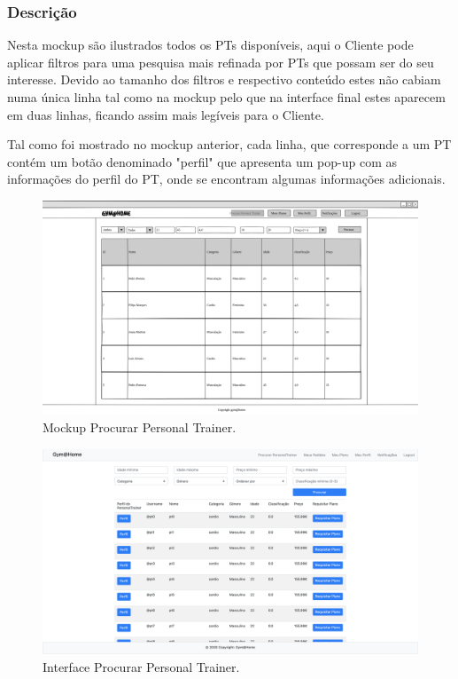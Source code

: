 \subsubsection{Descrição}
\hspace{5mm} Nesta mockup são ilustrados todos os PTs disponíveis, aqui o Cliente pode aplicar filtros para uma pesquisa mais refinada por PTs que possam ser do seu interesse. Devido ao tamanho dos filtros e respectivo conteúdo estes não cabiam numa única linha tal como na mockup pelo que na interface final estes aparecem em duas linhas, ficando assim mais legíveis para o Cliente.

\hspace{5mm} Tal como foi mostrado no mockup anterior, cada linha, que corresponde a um PT contém um botão denominado "perfil" que apresenta um pop-up com as informações do perfil do PT, onde se encontram algumas informações adicionais.

\begin{figure}[H]
    \centering
    \includegraphics[scale=0.25]{images/mockups/procurar_com_filtros_tabela_preenchida.png}
    \caption{Mockup Procurar Personal Trainer.}
    \label{fig:mockupprocurarpersonaltrainer}
\end{figure}

\begin{figure}[H]
    \centering
    \includegraphics[scale=0.25]{images/interfaces/client_procurar_pt.png}
    \caption{Interface Procurar Personal Trainer.}
    \label{fig:interfaceprocurarpersonaltrainer}
\end{figure}

